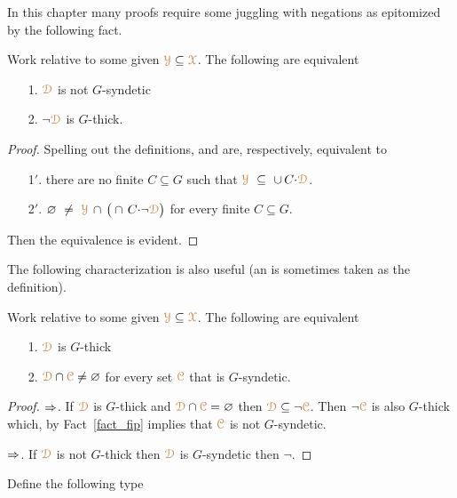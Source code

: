 In this chapter many proofs require some juggling with negations as epitomized by the following fact.

\begin{fact}\label{fact_fip}
  Work relative to some given ${\color{brown}\EuScript Y}\subseteq{\color{brown}\EuScript X}$.
  The following are equivalent
  \begin{itemize}
    \item[1.] ${\color{brown}\EuScript D}$ is not $G$-syndetic
    \item[2.] $\neg{\color{brown}\EuScript D}$ is $G$-thick.
  \end{itemize}\smallskip
\end{fact}

\begin{proof}
  Spelling out the definitions,  and  are, respectively, equivalent to
  \begin{itemize}
    \item[1$'$.] there are no finite $C\subseteq G$ such that ${\color{brown}\EuScript Y}\ \subseteq\ \cup\, C{\cdot}{\color{brown}\EuScript D}$.
    \item[2$'$.] $\varnothing\ \neq\ {\color{brown}\EuScript Y}\,\cap\,\big(\cap\, C{\cdot}\neg{\color{brown}\EuScript D}\big)$ for every finite $C\subseteq G$.
  \end{itemize} 
  Then the equivalence is evident.
\end{proof}

The following characterization is also useful (an is sometimes taken as the definition).

\begin{corollary}\label{fact_fip2}
  Work relative to some given ${\color{brown}\EuScript Y}\subseteq{\color{brown}\EuScript X}$.
  The following are equivalent
  \begin{itemize}
    \item[1.] ${\color{brown}\EuScript D}$ is $G$-thick
    \item[2.] ${\color{brown}\EuScript D}\cap{\color{brown}\EuScript C}\neq\varnothing$ for every set ${\color{brown}\EuScript C}$ that is $G$-syndetic.
  \end{itemize}
\end{corollary}

\begin{proof}
  $\Rightarrow$. 
  If ${\color{brown}\EuScript D}$ is $G$-thick and ${\color{brown}\EuScript D}\cap{\color{brown}\EuScript C}=\varnothing$ then ${\color{brown}\EuScript D}\subseteq\neg{\color{brown}\EuScript C}$.
  Then $\neg{\color{brown}\EuScript C}$ is also $G$-thick which, by Fact~\ref{fact_fip} implies that ${\color{brown}\EuScript C}$ is not $G$-syndetic.

  $\Rightarrow$. 
  If ${\color{brown}\EuScript D}$ is not $G$-thick then ${\color{brown}\EuScript D}$ is $G$-syndetic then $\neg$.
\end{proof}

Define the following type

